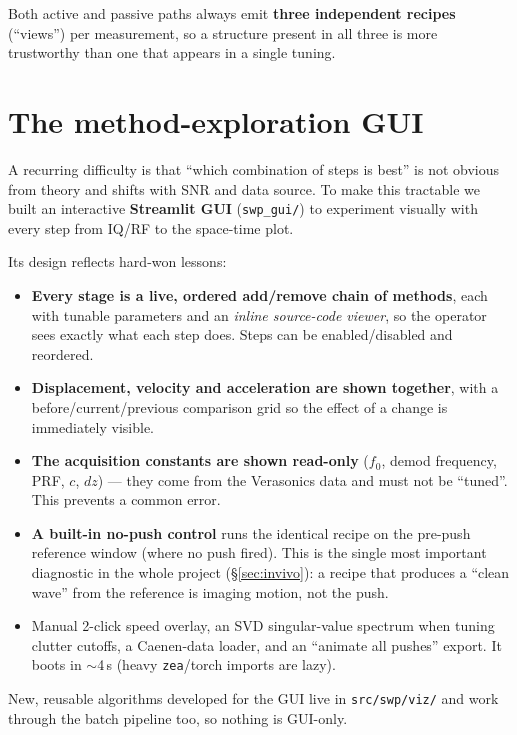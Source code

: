 \documentclass[11pt,a4paper]{article}
\begin{document}
Both active and passive paths always emit \textbf{three independent recipes} (``views'') per measurement, so
a structure present in all three is more trustworthy than one that appears in a single tuning.

\section{The method-exploration GUI}\label{sec:gui}
A recurring difficulty is that ``which combination of steps is best'' is not obvious from theory and shifts
with SNR and data source. To make this tractable we built an interactive \textbf{Streamlit GUI}
(\texttt{swp\_gui/}) to experiment visually with every step from IQ/RF to the space-time plot.

Its design reflects hard-won lessons:
\begin{itemize}
  \item \textbf{Every stage is a live, ordered add/remove chain of methods}, each with tunable parameters and
  an \emph{inline source-code viewer}, so the operator sees exactly what each step does. Steps can be
  enabled/disabled and reordered.
  \item \textbf{Displacement, velocity and acceleration are shown together}, with a before/current/previous
  comparison grid so the effect of a change is immediately visible.
  \item \textbf{The acquisition constants are shown read-only} ($f_0$, demod frequency, PRF, $c$, $dz$) ---
  they come from the Verasonics data and must not be ``tuned''. This prevents a common error.
  \item \textbf{A built-in no-push control} runs the identical recipe on the pre-push reference window (where
  no push fired). This is the single most important diagnostic in the whole project (\S\ref{sec:invivo}): a
  recipe that produces a ``clean wave'' from the reference is imaging motion, not the push.
  \item Manual 2-click speed overlay, an SVD singular-value spectrum when tuning clutter cutoffs, a
  Caenen-data loader, and an ``animate all pushes'' export. It boots in $\sim$4\,s (heavy \texttt{zea}/torch
  imports are lazy).
\end{itemize}
New, reusable algorithms developed for the GUI live in \texttt{src/swp/viz/} and work through the batch
pipeline too, so nothing is GUI-only.
\end{document}
